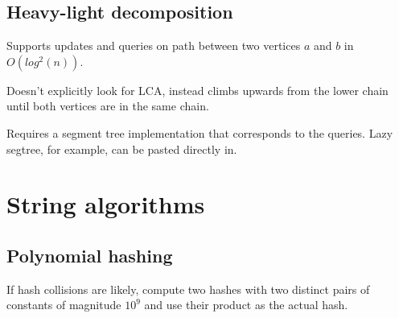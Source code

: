 \documentclass{article}
\begin{document}
\subsection {Heavy-light decomposition}

Supports updates and queries on path between two vertices $a$ and $b$ in $O(log^2(n))$.

Doesn't explicitly look for LCA, instead climbs upwards from the lower chain until both vertices are in the same chain.

Requires a segment tree implementation that corresponds to the queries. Lazy segtree, for example, can be pasted directly in.



\section {String algorithms}

\subsection {Polynomial hashing}

If hash collisions are likely, compute two hashes with two distinct pairs of constants of magnitude $10^9$ and use their product as the actual hash.


\end{document}
